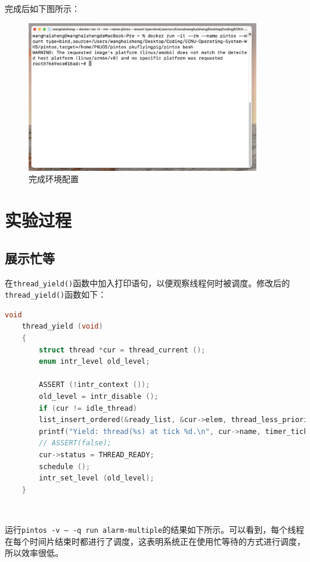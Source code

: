 \documentclass{article}
\begin{document}
完成后如下图所示：

\begin{figure}[H]
	\centering
	\includegraphics[width=0.9\textwidth]{img/run_docker.png}
	\caption{完成环境配置}
\end{figure}

\normalsize

\section{实验过程}

\subsection{展示忙等}

在\texttt{thread\_yield()}函数中加入打印语句，以便观察线程何时被调度。修改后的\texttt{thread\_yield()}函数如下：

\begin{lstlisting}[language=C, title=\texttt{thread\_yield}]
	void
	thread_yield (void)
	{
		struct thread *cur = thread_current ();
		enum intr_level old_level;
		
		ASSERT (!intr_context ());
		old_level = intr_disable ();
		if (cur != idle_thread)
		list_insert_ordered(&ready_list, &cur->elem, thread_less_priority, NULL);
		printf("Yield: thread(%s) at tick %d.\n", cur->name, timer_ticks());
		// ASSERT(false);
		cur->status = THREAD_READY;
		schedule ();
		intr_set_level (old_level);
	}
\end{lstlisting}

\

运行\texttt{pintos -v -- -q run alarm-multiple}的结果如下所示。可以看到，每个线程在每个时间片结束时都进行了调度，这表明系统正在使用忙等待的方式进行调度，所以效率很低。
\end{document}
